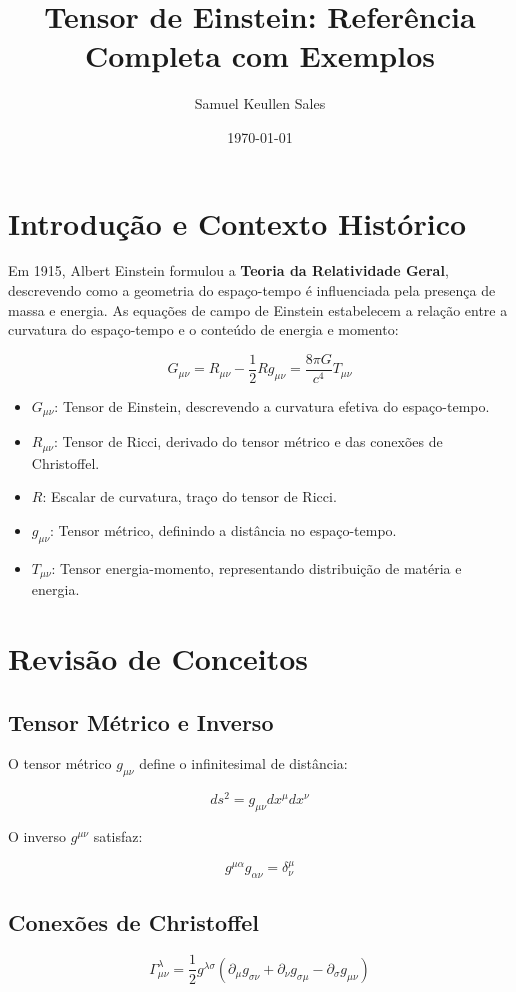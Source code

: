 \documentclass[12pt]{article}
\title{Tensor de Einstein: Referência Completa com Exemplos}
\author{Samuel Keullen Sales}
\date{\today}
\begin{document}
\maketitle

\tableofcontents
\newpage

\section{Introdução e Contexto Histórico}
Em 1915, Albert Einstein formulou a \textbf{Teoria da Relatividade Geral}, descrevendo como a geometria do espaço-tempo é influenciada pela presença de massa e energia. As equações de campo de Einstein estabelecem a relação entre a curvatura do espaço-tempo e o conteúdo de energia e momento:

\[
G_{\mu\nu} = R_{\mu\nu} - \frac{1}{2} R g_{\mu\nu} = \frac{8 \pi G}{c^4} T_{\mu\nu}
\]

\begin{itemize}
    \item $G_{\mu\nu}$: Tensor de Einstein, descrevendo a curvatura efetiva do espaço-tempo.
    \item $R_{\mu\nu}$: Tensor de Ricci, derivado do tensor métrico e das conexões de Christoffel.
    \item $R$: Escalar de curvatura, traço do tensor de Ricci.
    \item $g_{\mu\nu}$: Tensor métrico, definindo a distância no espaço-tempo.
    \item $T_{\mu\nu}$: Tensor energia-momento, representando distribuição de matéria e energia.
\end{itemize}

\section{Revisão de Conceitos}
\subsection{Tensor Métrico e Inverso}
O tensor métrico $g_{\mu\nu}$ define o infinitesimal de distância:

\[
ds^2 = g_{\mu\nu} dx^\mu dx^\nu
\]

O inverso $g^{\mu\nu}$ satisfaz:

\[
g^{\mu\alpha} g_{\alpha\nu} = \delta^\mu_\nu
\]

\subsection{Conexões de Christoffel}
\[
\Gamma^\lambda_{\mu\nu} = \frac{1}{2} g^{\lambda\sigma} \left( \partial_\mu g_{\sigma\nu} + \partial_\nu g_{\sigma\mu} - \partial_\sigma g_{\mu\nu} \right)
\]
\end{document}
